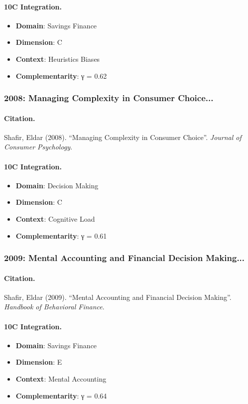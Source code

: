 \paragraph{10C Integration.}
\begin{itemize}[nosep]
  \item \textbf{Domain}: Savings Finance
  \item \textbf{Dimension}: C
  \item \textbf{Context}: Heuristics Biases
  \item \textbf{Complementarity}: γ = 0.62
\end{itemize}


\subsubsection{2008: Managing Complexity in Consumer Choice...}

\paragraph{Citation.}
Shafir, Eldar (2008). ``Managing Complexity in Consumer Choice''. \textit{Journal of Consumer Psychology}.

\paragraph{10C Integration.}
\begin{itemize}[nosep]
  \item \textbf{Domain}: Decision Making
  \item \textbf{Dimension}: C
  \item \textbf{Context}: Cognitive Load
  \item \textbf{Complementarity}: γ = 0.61
\end{itemize}


\subsubsection{2009: Mental Accounting and Financial Decision Making...}

\paragraph{Citation.}
Shafir, Eldar (2009). ``Mental Accounting and Financial Decision Making''. \textit{Handbook of Behavioral Finance}.

\paragraph{10C Integration.}
\begin{itemize}[nosep]
  \item \textbf{Domain}: Savings Finance
  \item \textbf{Dimension}: E
  \item \textbf{Context}: Mental Accounting
  \item \textbf{Complementarity}: γ = 0.64
\end{itemize}


